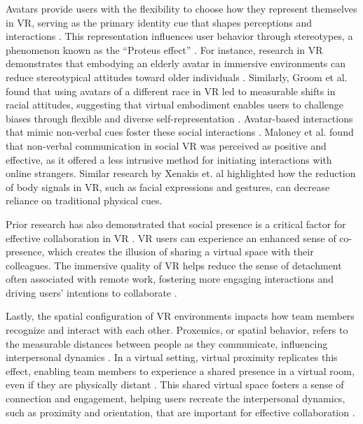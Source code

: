 Avatars provide users with the flexibility to choose how they represent themselves in VR, serving as the primary identity cue that shapes perceptions and interactions \cite{waltemate2018impact}. This representation influences user behavior through stereotypes, a phenomenon known as the ``Proteus effect'' \cite{yee2007proteus}. For instance, research in VR demonstrates that embodying an elderly avatar in immersive environments can reduce stereotypical attitudes toward older individuals \cite{yee2006walk}. Similarly, Groom et al. \cite{groom2009influence} found that using avatars of a different race in VR led to measurable shifts in racial attitudes, suggesting that virtual embodiment enables users to challenge biases through flexible and diverse self-representation \cite{banakou2016virtual}. Avatar-based interactions that mimic non-verbal cues foster these social interactions \cite{freeman2016intimate, clark1991grounding, oh2016let}. Maloney et al. \cite{maloney2020talking} found that non-verbal communication in social VR was perceived as positive and effective, as it offered a less intrusive method for initiating interactions with online strangers. Similar research by Xenakis et. al \cite{xenakis2022nonverbal} highlighted how the reduction of body signals in VR, such as facial expressions and gestures, can decrease reliance on traditional physical cues. 

Prior research has also demonstrated that social presence is a critical factor for effective collaboration in VR \cite{kimmel2023lets, sterna2021psychology, yassien2020design}. VR users can experience an enhanced sense of co-presence, which creates the illusion of sharing a virtual space with their colleagues. The immersive quality of VR helps reduce the sense of detachment often associated with remote work, fostering more engaging interactions \cite{wienrich2018social, smith2018communication} and driving users' intentions to collaborate \cite{mutterlein2018specifics}.

Lastly, the spatial configuration of VR environments impacts how team members recognize and interact with each other. Proxemics, or spatial behavior, refers to the measurable distances between people as they communicate, influencing interpersonal dynamics \cite{hans2015kinesics}. In a virtual setting, virtual proximity replicates this effect, enabling team members to experience a shared presence in a virtual room, even if they are physically distant \cite{williamson2021proxemics}. This shared virtual space fosters a sense of connection and engagement, helping users recreate the interpersonal dynamics, such as proximity and orientation, that are important for effective collaboration \cite{li2021social, williamson2022digital}. 

